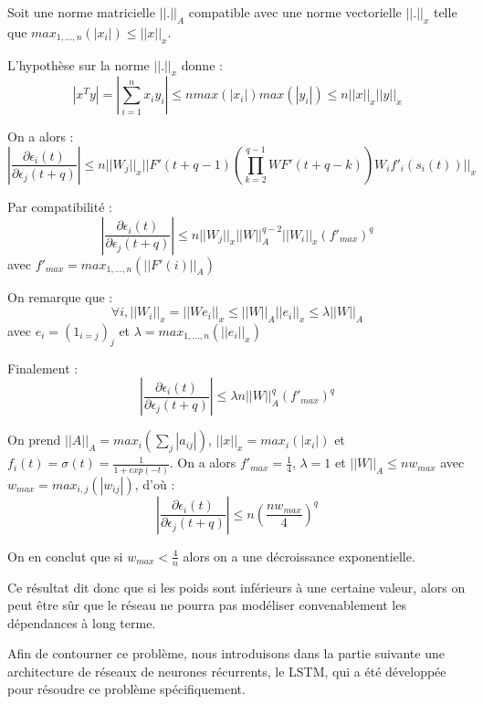 Soit une norme matricielle $||.||_A$ compatible avec une norme vectorielle $||.||_x$ telle que $max_{1, ..., n}(|x_i|) \leq ||x||_x$.

L'hypothèse sur la norme $||.||_x$ donne :
$$
|x^Ty| = |\sum_{i=1}^{n}{x_iy_i}| \leq n max(|x_i|) max(|y_i|) \leq n||x||_x ||y||_x
$$

On a alors :
$$
|\frac{\partial \epsilon_i(t)}{\partial \epsilon_j(t+q)}| \leq n ||W_j||_x ||F'(t + q - 1)(\prod_{k = 2}^{q-1}{WF'(t + q - k)})W_if'_i(s_i(t))||_x
$$

Par compatibilité :
$$
|\frac{\partial \epsilon_i(t)}{\partial \epsilon_j(t+q)}| \leq n ||W_j||_x ||W||_A^{q-2} ||W_i||_x (f'_{max})^{q}
$$
avec $f'_{max} = max_{1, ..., n}(||F'(i)||_A)$

On remarque que :
$$
\forall i, ||W_i||_x = ||We_i||_x \leq ||W||_A ||e_i||_x \leq \lambda ||W||_A
$$
avec $e_i=(1_{i=j})_j$ et $\lambda = max_{1, ..., n}(||e_i||_x)$

Finalement :
$$
|\frac{\partial \epsilon_i(t)}{\partial \epsilon_j(t+q)}| \leq \lambda n ||W||_A^{q}(f'_{max})^{q}
$$

On prend $||A||_A = max_i(\sum_{j}{|a_{ij}|})$, $||x||_x = max_i(|x_i|)$ et $f_i(t) = \sigma(t) = \frac{1}{1+exp(-t)}$. On a alors $f'_{max} = \frac{1}{4}$, $\lambda = 1$ et $||W||_A \leq n w_{max}$ avec $w_{max} = max_{i,j}(|w_{ij}|)$, d'où :
$$
|\frac{\partial \epsilon_i(t)}{\partial \epsilon_j(t+q)}| \leq n (\frac{nw_{max}}{4})^{q}
$$

On en conclut que si $w_{max} < \frac{4}{n}$ alors on a une décroissance exponentielle.

Ce résultat dit donc que si les poids sont inférieurs à une certaine valeur, alors on peut être sûr que le réseau ne pourra pas modéliser convenablement les dépendances à long terme.

Afin de contourner ce problème, nous introduisons dans la partie suivante une architecture de réseaux de neurones récurrents, le LSTM, qui a été développée pour résoudre ce problème spécifiquement.